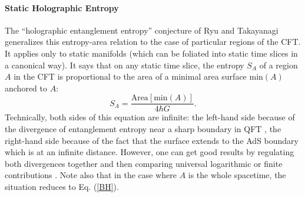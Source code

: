 \documentclass{article}
\begin{document}
\paragraph{Static Holographic Entropy} The ``holographic entanglement entropy'' conjecture of Ryu and Takayanagi \cite{RT06} generalizes this entropy-area relation to the case of particular regions of the CFT.  It applies only to static manifolds (which can be foliated into static time slices in a canonical way).  It says that on any static time slice, the entropy $S_A$ of a region $A$ in the CFT is proportional to the area of a minimal area surface $\mathrm{min}(A)$ anchored to $A$:
\begin{equation}\label{minA}
S_{A} = \frac{\mathrm{Area}[\mathrm{min}(A)]}{4\hbar G}.
\end{equation}
Technically, both sides of this equation are infinite: the left-hand side because of the divergence of entanglement entropy near a sharp boundary in QFT \cite{diverge}, the right-hand side because of the fact that the surface extends to the AdS boundary which is at an infinite distance.  However, one can get good results by regulating both divergences together and then comparing universal logarithmic or finite contributions \cite{RT06}.  Note also that in the case where $A$ is the whole spacetime, the situation reduces to Eq. (\ref{BH}).  
\end{document}
